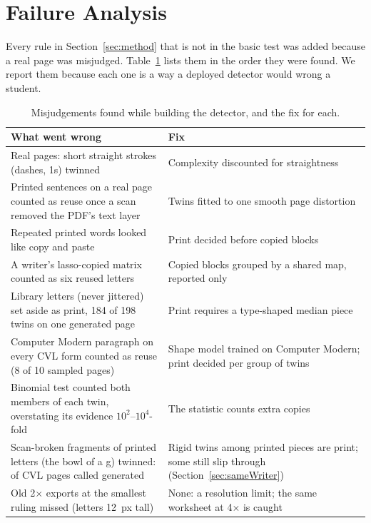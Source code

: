 \documentclass[conference]{IEEEtran}
\begin{document}
\section{Failure Analysis}
\label{sec:failures}

Every rule in Section~\ref{sec:method} that is not in the basic test was added because a real page was
misjudged. Table~\ref{tab:failures} lists them in the order they were found. We report them because each one is a
way a deployed detector would wrong a student.

\begin{table}[t]\centering
\caption{Misjudgements found while building the detector, and the fix for each.}\label{tab:failures}
\footnotesize
\begin{tabular}{@{}>{\raggedright\arraybackslash}p{}>{\raggedright\arraybackslash}p{}@{}}\toprule
What went wrong & Fix \\\midrule
Real pages: short straight strokes (dashes, 1s) twinned & Complexity discounted for straightness \\
Printed sentences on a real page counted as reuse once a scan removed the PDF's text layer & Twins fitted to one smooth page distortion \\
Repeated printed words looked like copy and paste & Print decided before copied blocks \\
A writer's lasso-copied matrix counted as six reused letters & Copied blocks grouped by a shared map, reported only \\
Library letters (never jittered) set aside as print, 184 of 198 twins on one generated page & Print requires a type-shaped median piece \\
Computer Modern paragraph on every CVL form counted as reuse (8 of 10 sampled pages) & Shape model trained on Computer Modern; print decided per group of twins \\
Binomial test counted both members of each twin, overstating its evidence $10^2$--$10^4$-fold & The statistic counts extra copies \\
Scan-broken fragments of printed letters (the bowl of a g) twinned: \CvlBeforeFixK{} of \CvlBeforeFixN{} CVL pages called generated & Rigid twins among printed pieces are print; some still slip through (Section~\ref{sec:sameWriter}) \\
Old 2$\times$ exports at the smallest ruling missed (letters 12~px tall) & None: a resolution limit; the same worksheet at 4$\times$ is caught \\
\bottomrule
\end{tabular}
\end{table}
\end{document}
